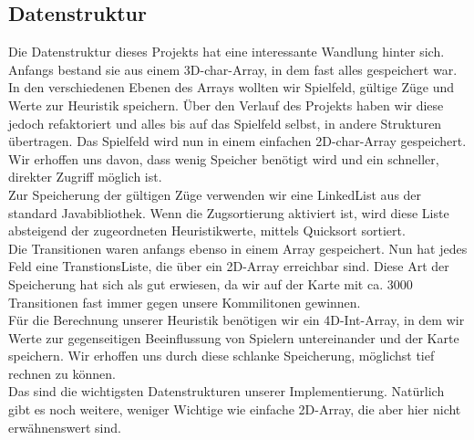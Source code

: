 \documentclass[12pt,a4paper,bibliography=totocnumbered,listof=totocnumbered]{scrartcl}
\begin{document}
	
	
	
	
	
	


    \subsection{Datenstruktur}
    \vspace{1em}
    Die Datenstruktur dieses Projekts hat eine interessante Wandlung hinter sich. Anfangs bestand sie aus einem 3D-char-Array, in dem fast alles gespeichert war. In den verschiedenen Ebenen des Arrays wollten wir Spielfeld, gültige Züge und Werte zur Heuristik speichern. Über den Verlauf des Projekts haben wir diese jedoch refaktoriert und alles bis auf das Spielfeld selbst, in andere Strukturen übertragen. Das Spielfeld wird nun in einem einfachen 2D-char-Array gespeichert. Wir erhoffen uns davon, dass wenig Speicher benötigt wird und ein schneller, direkter Zugriff möglich ist.\\
    Zur Speicherung der gültigen Züge verwenden wir eine LinkedList aus der standard Javabibliothek. Wenn die Zugsortierung aktiviert ist, wird diese Liste absteigend der zugeordneten Heuristikwerte, mittels Quicksort sortiert.\\
    Die Transitionen waren anfangs ebenso in einem Array gespeichert. Nun hat jedes Feld eine \glqq TranstionsListe\grqq{}, die über ein 2D-Array erreichbar sind. Diese Art der Speicherung hat sich als gut erwiesen, da wir auf der Karte mit ca. 3000 Transitionen fast immer gegen unsere Kommilitonen gewinnen.\\
    Für die Berechnung unserer Heuristik benötigen wir ein 4D-Int-Array, in dem wir Werte zur gegenseitigen Beeinflussung von Spielern untereinander und der Karte speichern. Wir erhoffen uns durch diese \glqq schlanke\grqq{} Speicherung, möglichst tief rechnen zu können.\\
    Das sind die wichtigsten Datenstrukturen unserer Implementierung. Natürlich gibt es noch weitere, weniger Wichtige wie einfache 2D-Array, die aber hier nicht erwähnenswert sind. 
\end{document}
